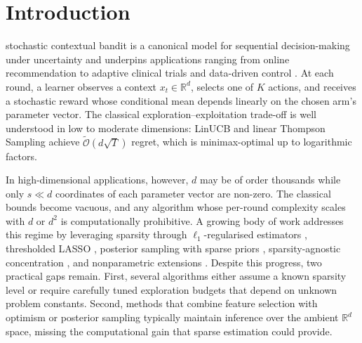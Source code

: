 \documentclass[journal,twoside,web]{ieeecolor}
\begin{document}
\section{Introduction}
 stochastic contextual bandit is a canonical model for sequential decision-making under uncertainty and underpins applications ranging from online recommendation to adaptive clinical trials and data-driven control \cite{li2010contextual,slivkins2019introduction}. At each round, a learner observes a context $x_t \in \mathbb{R}^d$, selects one of $K$ actions, and receives a stochastic reward whose conditional mean depends linearly on the chosen arm's parameter vector. The classical exploration--exploitation trade-off is well understood in low to moderate dimensions: LinUCB \cite{chu2011contextual} and linear Thompson Sampling \cite{agrawal2013thompson} achieve $\tilde{\mathcal{O}}(d\sqrt{T})$ regret, which is minimax-optimal up to logarithmic factors.

In high-dimensional applications, however, $d$ may be of order thousands while only $s \ll d$ coordinates of each parameter vector are non-zero. The classical bounds become vacuous, and any algorithm whose per-round complexity scales with $d$ or $d^2$ is computationally prohibitive. A growing body of work addresses this regime by leveraging sparsity through $\ell_1$-regularised estimators \cite{bastani2020online,kim2019doubly,oh2021sparsity,hao2020high}, thresholded LASSO \cite{ariu2022thresholded}, posterior sampling with sparse priors \cite{chakraborty2023thompson}, sparsity-agnostic concentration \cite{jin2024sparsity}, and nonparametric extensions \cite{valko2013kernels}. Despite this progress, two practical gaps remain. First, several algorithms either assume a known sparsity level or require carefully tuned exploration budgets that depend on unknown problem constants. Second, methods that combine feature selection with optimism or posterior sampling typically maintain inference over the ambient $\mathbb{R}^d$ space, missing the computational gain that sparse estimation could provide.
\end{document}
